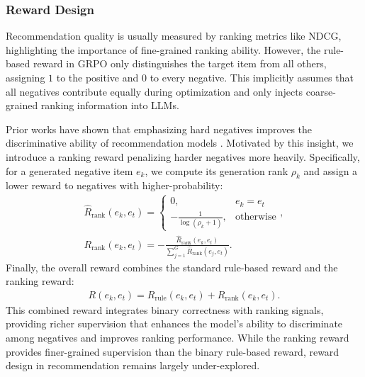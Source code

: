 {\subsubsection{Reward Design}
Recommendation quality is usually measured by ranking metrics like NDCG, highlighting the importance of fine-grained ranking ability. 
However, the rule-based reward in GRPO only distinguishes the target item from all others, assigning $1$ to the positive and $0$ to every negative.
This implicitly assumes that all negatives contribute equally during optimization and only injects coarse-grained ranking information into LLMs.

Prior works have shown that emphasizing hard negatives improves the discriminative ability of recommendation models \citep{SGL, sdpo}.
Motivated by this insight, we introduce a ranking reward penalizing harder negatives more heavily. 
Specifically, for a generated negative item $e_k$, we compute its generation rank $\rho_k$ and assign a lower reward to negatives with higher-probability:
\begin{align}
    \hat{R}_\text{rank}(e_k, e_t)=\begin{cases} 
    0, & e_k=e_t \\
    -\frac{1}{\log(\rho_k+1)}, & \text{otherwise} 
    \end{cases},\\
    R_\text{rank}(e_k,e_t)=-\frac{\hat{R}_\text{rank}(e_k,e_t)}{\sum_{j=1}^G \hat{R}_\text{rank}(e_j,e_t)}. \label{eq:ranking_reward}
\end{align}
Finally, the overall reward combines the standard rule-based reward and the ranking reward:
\begin{align}
    R(e_k,e_t)=R_\text{rule}(e_k,e_t)+R_\text{rank}(e_k,e_t).
\end{align}
This combined reward integrates binary correctness with ranking signals, providing richer supervision that enhances the model’s ability to discriminate among negatives and improves ranking performance.
While the ranking reward provides finer-grained supervision than the binary rule-based reward, reward design in recommendation remains largely under-explored. 
}


